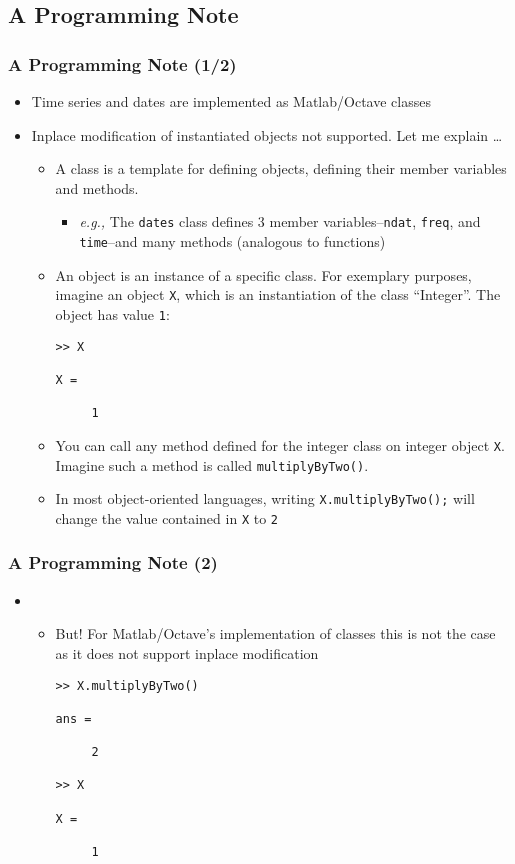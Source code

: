 \documentclass[10pt]{beamer}
\newcommand{\myitem}{\item[$\bullet$]}
\begin{document}
\subsection{A Programming Note}
\begin{frame}[fragile,t]
  \frametitle{A Programming Note (1/2)}
  \begin{itemize}
  \myitem Time series and dates are implemented as Matlab/Octave classes
  \myitem Inplace modification of instantiated objects not supported. Let me explain \dots
    \begin{itemize}
      \myitem A class is a template for defining objects, defining their member
      variables and methods.
      \begin{itemize}
        \myitem \textit{e.g.,} The \texttt{dates} class defines 3 member
        variables--\texttt{ndat}, \texttt{freq}, and \texttt{time}--and many
        methods (analogous to functions)
      \end{itemize}
      \myitem An object is an instance of a specific class. For exemplary
      purposes, imagine an object \texttt{X}, which is an instantiation of the
      class ``Integer''. The object has value \texttt{1}:
\begin{verbatim}
>> X

X =

     1
\end{verbatim}
    \myitem You can call any method defined for the integer class on integer
    object \texttt{X}. Imagine such a method is called
    \texttt{multiplyByTwo()}.
    \myitem In most object-oriented
    languages, writing \texttt{X.multiplyByTwo();} will change the value
    contained in \texttt{X} to \texttt{2}
    \end{itemize}
  \end{itemize}
\end{frame}


\begin{frame}[fragile,t]
  \frametitle{A Programming Note (2)}
  \begin{itemize}
    \item[] \begin{itemize}
  \myitem But! For Matlab/Octave's implementation of classes this is not the
    case as it does not support inplace modification
\begin{verbatim}
>> X.multiplyByTwo()

ans =

     2

>> X

X =

     1
\end{verbatim}
  \end{itemize}
  \end{itemize}
\end{frame}
\end{document}
